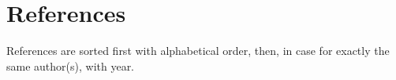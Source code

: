 \chapter* {References}

References are sorted first with alphabetical order, then, in case for exactly the same author(s), with year.

\printbibliography



